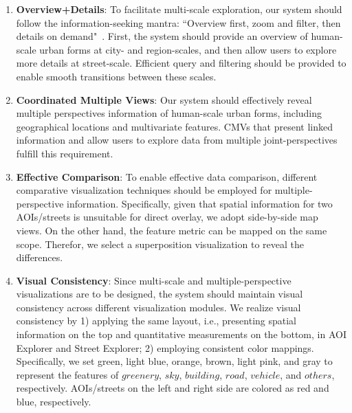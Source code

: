 \begin{enumerate}[label={R.\arabic*:}]

\vspace*{-2mm}
\item
\textbf{Overview+Details}:
To facilitate multi-scale exploration, our system should follow the information-seeking mantra: ``Overview first, zoom and filter, then details on demand"~\cite{shneiderman1996eyes}.
First, the system should provide an overview of human-scale urban forms at city- and region-scales, and then allow users to explore more details at street-scale.
Efficient query and filtering should be provided to enable smooth transitions between these scales.

\vspace*{-2mm}
\item
\textbf{Coordinated Multiple Views}:
Our system should effectively reveal multiple perspectives information of human-scale urban forms, including geographical locations and multivariate features.
CMVs that present linked information and allow users to explore data from multiple joint-perspectives fulfill this requirement.


\vspace*{-2mm}
\item
\textbf{Effective Comparison}:
To enable effective data comparison, different comparative visualization techniques should be employed for multiple-perspective information.
Specifically, given that spatial information for two AOIs/streets is unsuitable for direct overlay, we adopt side-by-side map views.
On the other hand, the feature metric can be mapped on the same scope. 
Therefor, we select a superposition visualization to reveal the differences.

\vspace*{-2mm}
\item
\textbf{Visual Consistency}:
Since multi-scale and multiple-perspective visualizations are to be designed, the system should maintain visual consistency across different visualization modules.
We realize visual consistency by 
1) applying the same layout, i.e., presenting spatial information on the top and quantitative measurements on the bottom, in AOI Explorer and Street Explorer;
2) employing consistent color mappings. 
Specifically, we set green, light blue, orange, brown, light pink, and gray to represent the features of $greenery$, $sky$, $building$, $road$, $vehicle$, and $others$, respectively.
AOIs/streets on the left and right side are colored as red and blue, respectively.

\end{enumerate}

